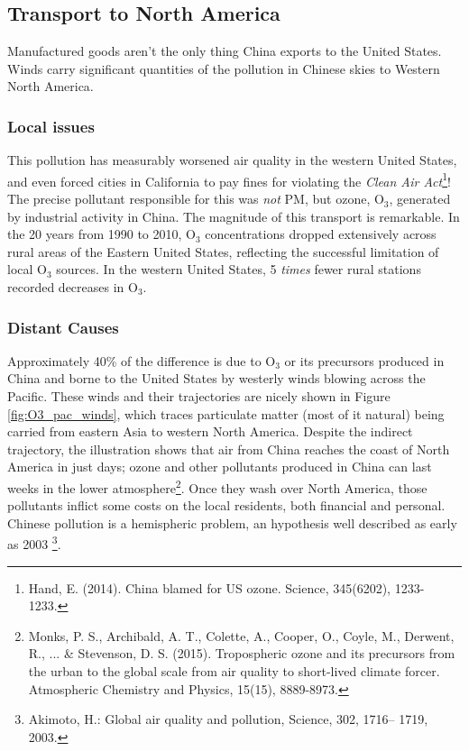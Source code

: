 \documentclass[amstex,12pt]{book}
\newcommand{\textsub}[1]{$_{\text{#1}}$}
\begin{document}
\subsection{Transport to North America}
Manufactured goods aren't the only thing China exports to the United States. Winds carry significant quantities of the pollution in Chinese skies to Western North America.

\subsubsection{Local issues}
This pollution has measurably worsened air quality in the western United States, and even forced cities in California to pay fines for violating the \emph{Clean Air Act}\footnote{Hand, E. (2014). China blamed for US ozone. Science, 345(6202), 1233-1233.}! The precise pollutant responsible for this was \emph{not} PM, but ozone, O\textsub{3}, generated by industrial activity in China. The magnitude of this transport is remarkable. In the 20 years from 1990 to 2010, O\textsub{3} concentrations dropped extensively across rural areas of the Eastern United States, reflecting the successful limitation of local O\textsub{3} sources. In the western United States, 5 \emph{times} fewer rural stations recorded decreases in O\textsub{3}.

\subsubsection{Distant Causes}
Approximately 40\% of the difference is due to O\textsub{3} or its precursors produced in China and borne to the United States by westerly winds blowing across the Pacific. These winds and their trajectories are nicely shown in Figure \ref{fig:O3_pac_winds}, which traces particulate matter (most of it natural) being carried from eastern Asia to western North America. Despite the indirect trajectory, the illustration shows that air from China reaches the coast of North America in just days; ozone and other pollutants produced in China can last weeks in the lower atmosphere\footnote{Monks, P. S., Archibald, A. T., Colette, A., Cooper, O., Coyle, M., Derwent, R., ... \& Stevenson, D. S. (2015). Tropospheric ozone and its precursors from the urban to the global scale from air quality to short-lived climate forcer. Atmospheric Chemistry and Physics, 15(15), 8889-8973.}. Once they wash over North America, those pollutants inflict some costs on the local residents, both financial and personal. Chinese pollution is a hemispheric problem, an hypothesis well described as early as 2003 \footnote{Akimoto, H.: Global air quality and pollution, Science, 302, 1716–
1719, 2003.}.  
\end{document}
